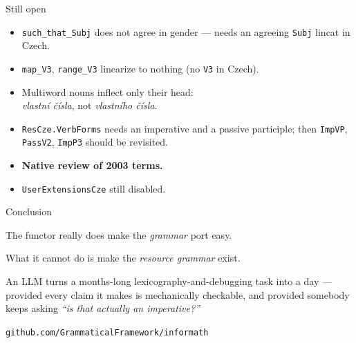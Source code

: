\documentclass[10pt,aspectratio=169]{beamer}
\begin{document}
\begin{frame}{Still open}
  \begin{itemize}
    \item \texttt{such\_that\_Subj} does not agree in gender --- needs an
          agreeing \texttt{Subj} lincat in Czech.
    \item \texttt{map\_V3}, \texttt{range\_V3} linearize to nothing (no \texttt{V3} in Czech).
    \item Multiword nouns inflect only their head: \\
          \emph{vlastní čísla}, not \emph{vlastního čísla}.
    \item \texttt{ResCze.VerbForms} needs an imperative and a passive participle;
          then \texttt{ImpVP}, \texttt{PassV2}, \texttt{ImpP3} should be revisited.
    \item \textbf{Native review of 2003 terms.}
    \item \texttt{UserExtensionsCze} still disabled.
  \end{itemize}
\end{frame}

\begin{frame}{Conclusion}
  \begin{center}
  \Large
  The functor really does make the \emph{grammar} port easy.

  \vspace{1em}
  What it cannot do is make the \emph{resource grammar} exist.
  \end{center}

  \vspace{1.5em}
  \normalsize
  An LLM turns a months-long lexicography-and-debugging task into a day ---
  provided every claim it makes is mechanically checkable, and provided somebody
  keeps asking \emph{``is that actually an imperative?''}

  \vspace{1em}
  \begin{center}
  \small
  \texttt{github.com/GrammaticalFramework/informath}
  \end{center}
\end{frame}
\end{document}
